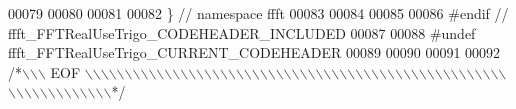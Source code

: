 \begin{DoxyCode}
00079 
00080 
00081 
00082 \}   \textcolor{comment}{// namespace ffft}
00083 
00084 
00085 
00086 \textcolor{preprocessor}{#endif  // ffft\_FFTRealUseTrigo\_CODEHEADER\_INCLUDED}
00087 
00088 \textcolor{preprocessor}{#undef ffft\_FFTRealUseTrigo\_CURRENT\_CODEHEADER}
00089 
00090 
00091 
00092 \textcolor{comment}{/*\(\backslash\)\(\backslash\)\(\backslash\) EOF \(\backslash\)\(\backslash\)\(\backslash\)\(\backslash\)\(\backslash\)\(\backslash\)\(\backslash\)\(\backslash\)\(\backslash\)\(\backslash\)\(\backslash\)\(\backslash\)\(\backslash\)\(\backslash\)\(\backslash\)\(\backslash\)\(\backslash\)\(\backslash\)\(\backslash\)\(\backslash\)\(\backslash\)\(\backslash\)\(\backslash\)\(\backslash\)\(\backslash\)\(\backslash\)\(\backslash\)\(\backslash\)\(\backslash\)\(\backslash\)\(\backslash\)\(\backslash\)\(\backslash\)\(\backslash\)\(\backslash\)\(\backslash\)\(\backslash\)\(\backslash\)\(\backslash\)\(\backslash\)\(\backslash\)\(\backslash\)\(\backslash\)\(\backslash\)\(\backslash\)\(\backslash\)\(\backslash\)\(\backslash\)\(\backslash\)\(\backslash\)\(\backslash\)\(\backslash\)\(\backslash\)\(\backslash\)\(\backslash\)\(\backslash\)\(\backslash\)\(\backslash\)\(\backslash\)\(\backslash\)\(\backslash\)\(\backslash\)\(\backslash\)\(\backslash\)\(\backslash\)\(\backslash\)*/}
\end{DoxyCode}
